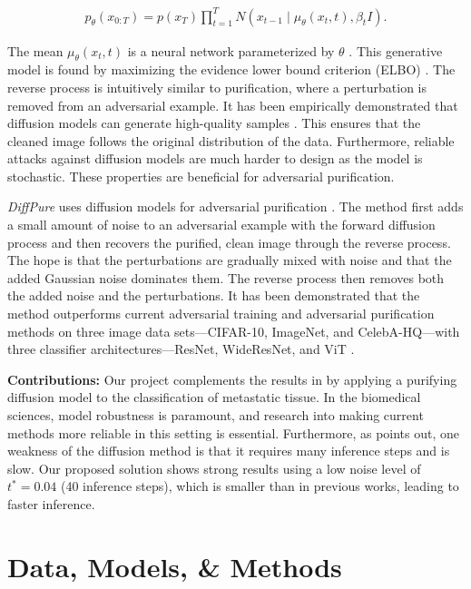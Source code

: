 \begin{align}
    p_\theta\left(x_{0: T}\right)=p\left(x_T\right) \prod_{t=1}^T N\left(x_{t-1} \mid \mu_\theta\left(x_t, t\right), \beta_t I\right).
\end{align}


The mean $\mu_\theta\left(x_t, t\right)$ is a neural network parameterized by $\theta$ \cite{DiffusionPaper}. This generative model is found by maximizing the evidence lower bound criterion (ELBO) \cite{DiffusionPaper}. The reverse process is intuitively similar to purification, where a perturbation is removed from an adversarial example. It has been empirically demonstrated that diffusion models can generate high-quality samples \cite{DiffusionPaper}. This ensures that the cleaned image follows the original distribution of the data. Furthermore, reliable attacks against diffusion models are much harder to design as the model is stochastic. These properties are beneficial for adversarial purification.

\emph{DiffPure} uses diffusion models for adversarial purification \cite{DiffPure}. The method first adds a small amount of noise to an adversarial example with the forward diffusion process and then recovers the purified, clean image through the reverse process. The hope is that the perturbations are gradually mixed with noise and that the added Gaussian noise dominates them. The reverse process then removes both the added noise and the perturbations. It has been demonstrated that the method outperforms current adversarial training and adversarial purification methods on three image data sets---CIFAR-10, ImageNet, and CelebA-HQ---with three classifier architectures---ResNet, WideResNet, and ViT \cite{DiffPure}.

\textbf{Contributions:} Our project complements the results in \cite{DiffPure} by applying a purifying diffusion model to the classification of metastatic tissue. In the biomedical sciences, model robustness is paramount, and research into making current methods more reliable in this setting is essential. Furthermore, as \cite{DiffPure} points out, one weakness of the diffusion method is that it requires many inference steps and is slow. Our proposed solution shows strong results using a low noise level of $t^*=0.04$ (40 inference steps), which is smaller than in previous works, leading to faster inference.


\section{Data, Models, \& Methods}
\label{sec:methods}


